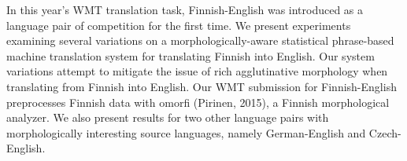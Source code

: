 In this year's WMT translation task, Finnish-English was introduced as a language pair of competition for the first time. We present experiments examining several variations on a morphologically-aware statistical phrase-based machine translation system for translating Finnish into English. Our system variations attempt to mitigate the issue of rich agglutinative morphology when translating from Finnish into English. Our WMT submission for Finnish-English preprocesses Finnish data with omorfi (Pirinen, 2015), a Finnish morphological analyzer. We also present results for two other language pairs with morphologically interesting source languages, namely German-English and Czech-English.
